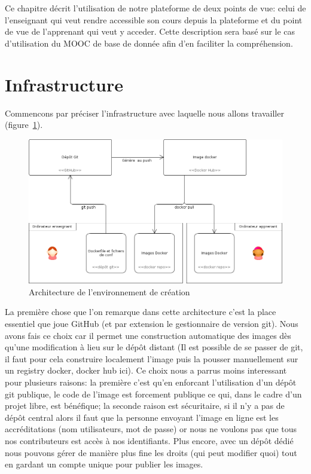 \documentclass[a4paper,11pt]{report}
\begin{document}
\pagestyle{fancy}

Ce chapitre décrit l'utilisation de notre plateforme de deux points de vue: celui de l'enseignant qui veut rendre accessible son cours depuis la plateforme et du point de vue de l'apprenant qui veut y acceder.
Cette description sera basé sur le cas d'utilisation du MOOC de base de donnée afin d'en faciliter la compréhension.

\section{Infrastructure}

Commencons par préciser l'infrastructure avec laquelle nous allons travailler (figure~\ref{infrastructure-creation}).

\begin{figure}[!h]
   \caption{\label{infrastructure-creation} Architecture de l'environnement de création}
   \centering
   \includegraphics[width=\textwidth, keepaspectratio=true]{infrastructure-creation.png}
\end{figure}

La première chose que l'on remarque dans cette architecture c'est la place essentiel que joue GitHub (et par extension le gestionnaire de version git). Nous avons fais ce choix car il permet une construction automatique des images dès qu'une modification à lieu sur le dépôt distant (Il est possible de se passer de git, il faut pour cela construire localement l'image puis la pousser manuellement sur un registry docker, docker hub ici). Ce choix nous a parrus moins interessant pour plusieurs raisons: la première c'est qu'en enforcant l'utilisation d'un dépôt git publique, le code de l'image est forcement publique ce qui, dans le cadre d'un projet libre, est bénéfique; la seconde raison est sécuritaire, si il n'y a pas de dépôt central alors il faut que la personne envoyant l'image en ligne est les accréditations (nom utilisateurs, mot de passe) or nous ne voulons pas que tous nos contributeurs est accès à nos identifiants. Plus encore, avec un dépôt dédié nous pouvons gérer de manière plus fine les droits (qui peut modifier quoi) tout en gardant un compte unique pour publier les images.
\end{document}
